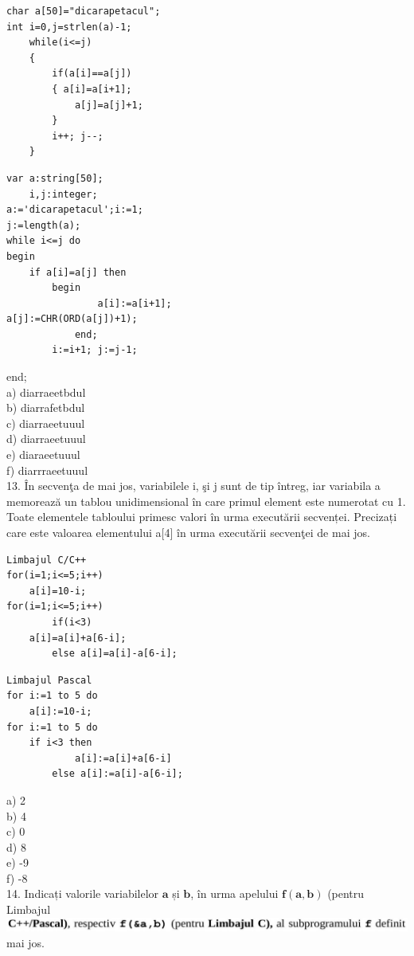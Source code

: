 \documentclass[10pt]{article}
\begin{document}
\begin{verbatim}
char a[50]="dicarapetacul";
int i=0,j=strlen(a)-1;
    while(i<=j)
    {
        if(a[i]==a[j])
        { a[i]=a[i+1];
            a[j]=a[j]+1;
        }
        i++; j--;
    }
\end{verbatim}

\begin{verbatim}
var a:string[50];
    i,j:integer;
a:='dicarapetacul';i:=1;
j:=length(a);
while i<=j do
begin
    if a[i]=a[j] then
        begin
                a[i]:=a[i+1];
a[j]:=CHR(ORD(a[j])+1);
            end;
        i:=i+1; j:=j-1;
\end{verbatim}

end;\\
a) diarraeetbdul\\
b) diarrafetbdul\\
c) diarraeetuuul\\
d) diarraeetuuul\\
e) diaraeetuuul\\
f) diarrraeetuuul\\[0pt]
13. În secvenţa de mai jos, variabilele i, şi j sunt de tip întreg, iar variabila a memorează un tablou unidimensional în care primul element este numerotat cu 1. Toate elementele tabloului primesc valori în urma executării secvenței. Precizați care este valoarea elementului a[4] în urma executării secvenţei de mai jos.

\begin{verbatim}
Limbajul C/C++
for(i=1;i<=5;i++)
    a[i]=10-i;
for(i=1;i<=5;i++)
        if(i<3)
    a[i]=a[i]+a[6-i];
        else a[i]=a[i]-a[6-i];
\end{verbatim}

\begin{verbatim}
Limbajul Pascal
for i:=1 to 5 do
    a[i]:=10-i;
for i:=1 to 5 do
    if i<3 then
            a[i]:=a[i]+a[6-i]
        else a[i]:=a[i]-a[6-i];
\end{verbatim}

a) 2\\
b) 4\\
c) 0\\
d) 8\\
e) -9\\
f) -8\\
14. Indicați valorile variabilelor $\mathbf{a}$ și $\mathbf{b}$, în urma apelului $\mathbf{f ( a , b )}$ (pentru Limbajul\\
\includegraphics[max width=\textwidth]{2025_04_17_46e04c6acd873ea9558dg-080} mai jos.
\end{document}
